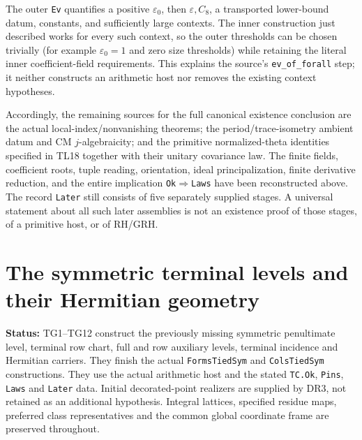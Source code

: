 \documentclass[11pt,a4paper]{article}
\numberwithin{equation}{section}
\theoremstyle{remark}\newtheorem{remark}[theorem]{Remark}
\newcommand{\status}[1]{\textbf{Status:} #1}
\begin{document}
The outer \texttt{Ev} quantifies a positive $\varepsilon_0$, then
$\varepsilon,C_8$, a transported lower-bound datum, constants,
and sufficiently large contexts. The inner construction just
described works for every such context, so the outer thresholds
can be chosen trivially (for example $\varepsilon_0=1$ and
zero size thresholds) while retaining the literal inner
coefficient-field requirements. This explains the source's
\texttt{ev\_\allowbreak of\_\allowbreak forall} step; it neither constructs an arithmetic
host nor removes the existing context hypotheses.

Accordingly, the remaining sources for the full canonical
existence conclusion are the actual local-index/nonvanishing
theorems; the period/trace-isometry ambient datum and CM
$j$-algebraicity; and the primitive normalized-theta identities
specified in TL18 together with their unitary covariance law.
The finite fields, coefficient roots, tuple reading, orientation,
ideal principalization, finite derivative reduction, and the
entire implication \texttt{Ok}$\Rightarrow$\texttt{Laws} have
been reconstructed above. The record \texttt{Later} still
consists of five separately supplied stages. A universal
statement about all such later assemblies is not an existence
proof of those stages, of a primitive host, or of RH/GRH.



\section{The symmetric terminal levels and their Hermitian geometry}
\label{sec:terminal-geometry}

\status{TG1--TG12 construct the previously missing symmetric
penultimate level, terminal row chart, full and row auxiliary levels,
terminal incidence and Hermitian carriers. They finish the actual
\texttt{FormsTiedSym} and \texttt{ColsTiedSym} constructions.
They use the actual arithmetic
host and the stated \texttt{TC.Ok}, \texttt{Pins}, \texttt{Laws} and
\texttt{Later} data. Initial decorated-point realizers are supplied by
DR3, not retained as an additional hypothesis. Integral lattices,
specified residue maps, preferred class representatives and the common
global coordinate frame are preserved throughout.}
\end{document}
